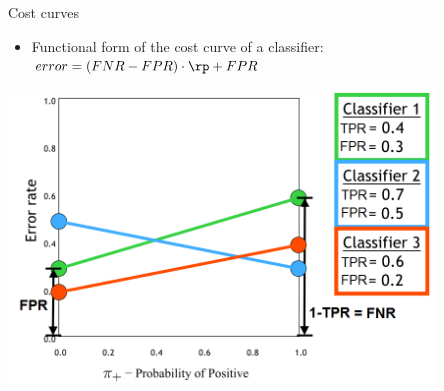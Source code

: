 \begin{vbframe}{Cost curves}

\begin{itemize}
  \item Functional form of the cost curve of a classifier:
  $error = (FNR - FPR) \cdot \rp + FPR$ %
\end{itemize}
\begin{center}
\includegraphics[width=0.85\textwidth]{figure_man/cost-curves-3.png}
\end{center}






\end{vbframe}


